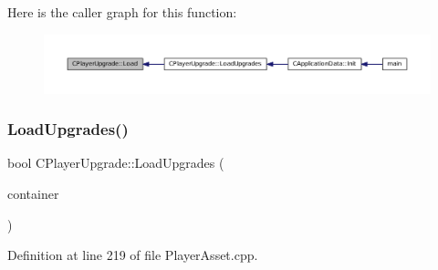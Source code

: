Here is the caller graph for this function\+:
\nopagebreak
\begin{figure}[H]
\begin{center}
\leavevmode
\includegraphics[width=350pt]{classCPlayerUpgrade_a685fab69765ef63952cdbcaa6b1b927b_icgraph}
\end{center}
\end{figure}
\hypertarget{classCPlayerUpgrade_a9bef3d3f2866cd555a9b175426e953d6}{}\label{classCPlayerUpgrade_a9bef3d3f2866cd555a9b175426e953d6} 
\subsubsection{\texorpdfstring{Load\+Upgrades()}{LoadUpgrades()}}
{\footnotesize\ttfamily bool C\+Player\+Upgrade\+::\+Load\+Upgrades (\begin{DoxyParamCaption}\item[{std\+::shared\+\_\+ptr$<$ \hyperlink{classCDataSourceContainer}{C\+Data\+Source\+Container} $>$}]{container }\end{DoxyParamCaption})\hspace{0.3cm}{\ttfamily [static]}}



Definition at line 219 of file Player\+Asset.\+cpp.


